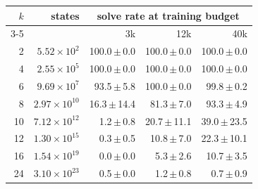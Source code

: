 \begin{tabular}{rrrrr}
\toprule
$k$ & states & \multicolumn{3}{c}{solve rate at training budget} \\
\cmidrule(l){3-5}
 & & 3k & 12k & 40k \\
\midrule
2 & $5.52\!\times\!10^{2}$ & 100.0\,$\pm$\,0.0 & 100.0\,$\pm$\,0.0 & 100.0\,$\pm$\,0.0 \\
4 & $2.55\!\times\!10^{5}$ & 100.0\,$\pm$\,0.0 & 100.0\,$\pm$\,0.0 & 100.0\,$\pm$\,0.0 \\
6 & $9.69\!\times\!10^{7}$ & 93.5\,$\pm$\,5.8 & 100.0\,$\pm$\,0.0 & 99.8\,$\pm$\,0.2 \\
8 & $2.97\!\times\!10^{10}$ & 16.3\,$\pm$\,14.4 & 81.3\,$\pm$\,7.0 & 93.3\,$\pm$\,4.9 \\
10 & $7.12\!\times\!10^{12}$ & 1.2\,$\pm$\,0.8 & 20.7\,$\pm$\,11.1 & 39.0\,$\pm$\,23.5 \\
12 & $1.30\!\times\!10^{15}$ & 0.3\,$\pm$\,0.5 & 10.8\,$\pm$\,7.0 & 22.3\,$\pm$\,10.1 \\
16 & $1.54\!\times\!10^{19}$ & 0.0\,$\pm$\,0.0 & 5.3\,$\pm$\,2.6 & 10.7\,$\pm$\,3.5 \\
24 & $3.10\!\times\!10^{23}$ & 0.5\,$\pm$\,0.0 & 1.2\,$\pm$\,0.8 & 0.7\,$\pm$\,0.9 \\
\bottomrule
\end{tabular}